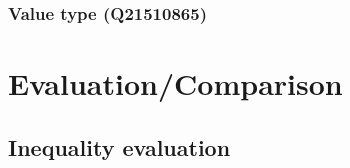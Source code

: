 \documentclass[hyperref,bachelorofscience,fleqn]{cgvpub}
\begin{document}
\subsection{Value type (Q21510865)}

\chapter{Evaluation/Comparison}

\section{Inequality evaluation}\label{sec_inequality_evaluation}
\end{document}
